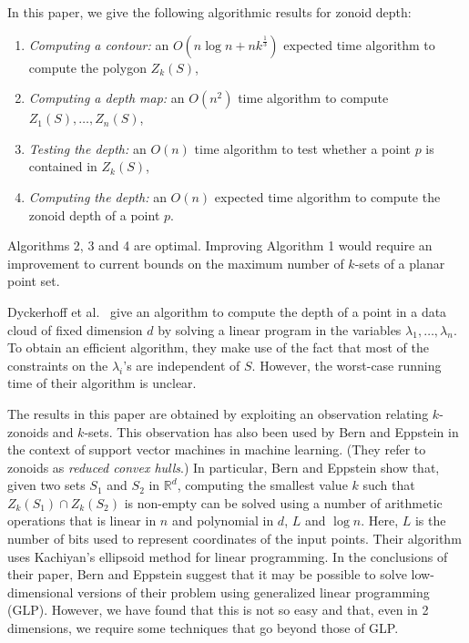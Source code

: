 \documentclass{elsart}
\begin{document}
In this paper, we give the following algorithmic results for zonoid
depth:

\begin{enumerate}

\item\emph{Computing a contour:} an $O(n \log n + nk^{\frac{1}{3}})$
expected time algorithm to compute the polygon $Z_k(S)$,

\item\emph{Computing a depth map:} an $O(n^2)$ time algorithm to compute
$Z_1(S),\ldots,Z_n(S)$,

\item\emph{Testing the depth:} an $O(n)$ time algorithm to test whether a
point $p$ is contained in $Z_k(S)$,

\item\emph{Computing the depth:} an $O(n)$ expected time algorithm to
compute the zonoid depth of a point $p$.

\end{enumerate}

Algorithms 2, 3 and 4 are optimal. Improving Algorithm 1 would require an
improvement to current bounds on the maximum number of $k$-sets
of a planar point set.

Dyckerhoff et al.\ \cite{zonoid_data_depth_theory_and_computation}
give an algorithm to compute the depth of a point in a data cloud of
fixed dimension $d$ by solving a linear program in the variables
$\lambda_1,\ldots, \lambda_n$. To obtain an efficient algorithm, they
make use of the fact that most of the constraints on the $\lambda_i$'s
are independent of $S$. However, the worst-case running time of their
algorithm is unclear. 

The results in this paper are obtained by exploiting an observation 
relating $k$-zonoids
and $k$-sets.  This observation has also been used by Bern and
Eppstein \cite{bern-eppstein-01} in the context of support vector
machines in machine learning.  (They refer to zonoids as \emph{reduced
convex hulls}.) In particular, Bern and Eppstein show that, given two
sets $S_1$ and $S_2$ in $\mathbb{R}^d$, computing the smallest value
$k$ such that $Z_k(S_1)\cap Z_k(S_2)$ is non-empty can be solved using
a number of arithmetic operations that is linear in $n$ and polynomial
in $d$, $L$ and $\log n$.  Here, $L$ is the number of bits used to
represent coordinates of the input points.  Their algorithm uses
Kachiyan's ellipsoid method \cite{k79} for linear programming.  In the
conclusions of their paper, Bern and Eppstein suggest that it may be
possible to solve low-dimensional versions of their problem using
generalized linear programming (GLP).  However, we have found that
this is not so easy and that, even in 2 dimensions, we require some
techniques that go beyond those of GLP.
\end{document}
